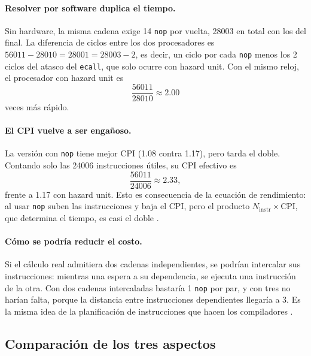 \documentclass[11pt,a4paper]{article}
\begin{document}
\paragraph{Resolver por software duplica el tiempo.}
Sin hardware, la misma cadena exige 14 \texttt{nop} por vuelta, 28003 en total
con los del final. La diferencia de ciclos entre los dos procesadores es
$56011 - 28010 = 28001 = 28003 - 2$, es decir, un ciclo por cada \texttt{nop}
menos los 2 ciclos del atasco del \texttt{ecall}, que solo ocurre con hazard
unit. Con el mismo reloj, el procesador con hazard unit es
\begin{equation}
  \frac{56011}{28010} \approx 2.00
\end{equation}
veces m\'as r\'apido.

\paragraph{El CPI vuelve a ser enga\~noso.}
La versi\'on con \texttt{nop} tiene mejor CPI (1.08 contra 1.17), pero tarda el
doble. Contando solo las 24006 instrucciones \'utiles, su CPI efectivo es
\begin{equation}
  \frac{56011}{24006} \approx 2.33 ,
\end{equation}
frente a 1.17 con hazard unit. Esto es consecuencia de la ecuaci\'on de
rendimiento: al usar \texttt{nop} suben las instrucciones y baja el CPI, pero el
producto $N_{\text{instr}} \times \text{CPI}$, que determina el tiempo, es casi el
doble \cite{harris,patterson}.

\paragraph{C\'omo se podr\'ia reducir el costo.}
Si el c\'alculo real admitiera dos cadenas independientes, se podr\'ian intercalar
sus instrucciones: mientras una espera a su dependencia, se ejecuta una
instrucci\'on de la otra. Con dos cadenas intercaladas bastar\'ia 1 \texttt{nop} por
par, y con tres no har\'ian falta, porque la distancia entre instrucciones
dependientes llegar\'ia a 3. Es la misma idea de la planificaci\'on de
instrucciones que hacen los compiladores \cite{patterson}.

\subsection{Comparaci\'on de los tres aspectos}
\end{document}
